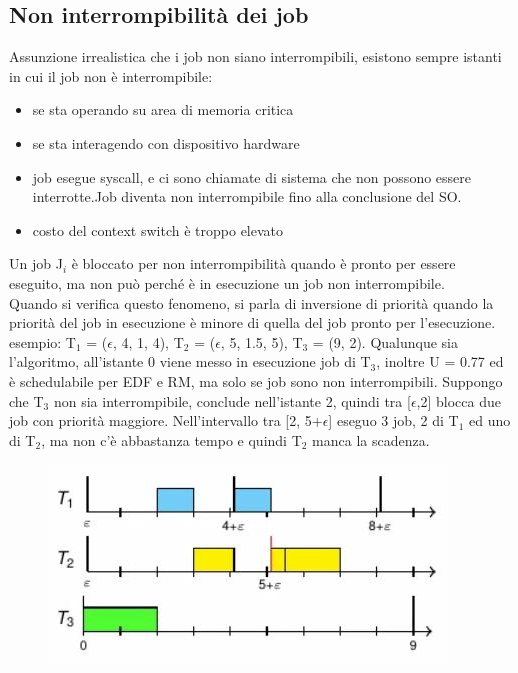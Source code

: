 \documentclass[12pt, oneside]{extbook}
\begin{document}
\subsection{Non interrompibilità dei job}
Assunzione irrealistica che i job non siano interrompibili, esistono sempre istanti in cui il job non è interrompibile:
\begin{itemize}
\item se sta operando su area di memoria critica
\item se sta interagendo con dispositivo hardware
\item job esegue syscall, e ci sono chiamate di sistema che non possono essere interrotte.Job diventa non interrompibile fino alla conclusione del SO.
\item costo del context switch è troppo elevato
\end{itemize}
Un job J$_{i}$ è bloccato per non interrompibilità quando è  pronto per essere eseguito, ma non può perché è in esecuzione un job non interrompibile.\\ Quando si verifica questo fenomeno, si parla di inversione di priorità quando la priorità del job in esecuzione è minore di quella del job pronto per l'esecuzione. esempio: T$_{1}$ = ($\epsilon$, 4, 1, 4), T$_{2}$ = ($\epsilon$, 5, 1.5, 5), T$_{3}$ = (9, 2). Qualunque sia l'algoritmo, all'istante 0 viene messo in esecuzione job di T$_{3}$, inoltre U = 0.77 ed è schedulabile per EDF e RM, ma solo se job sono non interrompibili. Suppongo che T$_{3}$ non sia interrompibile, conclude nell'istante 2, quindi tra [$\epsilon$,2] blocca due job con priorità maggiore. Nell'intervallo tra [2, 5+$\epsilon$] eseguo 3 job, 2 di T$_{1}$ ed uno di T$_{2}$, ma non c'è abbastanza tempo e quindi T$_{2}$ manca la scadenza.\\ 
\begin{figure}[!h]
\centering
\includegraphics[scale=0.4]{immagini/image-007.jpg}
\end{figure}
\end{document}
